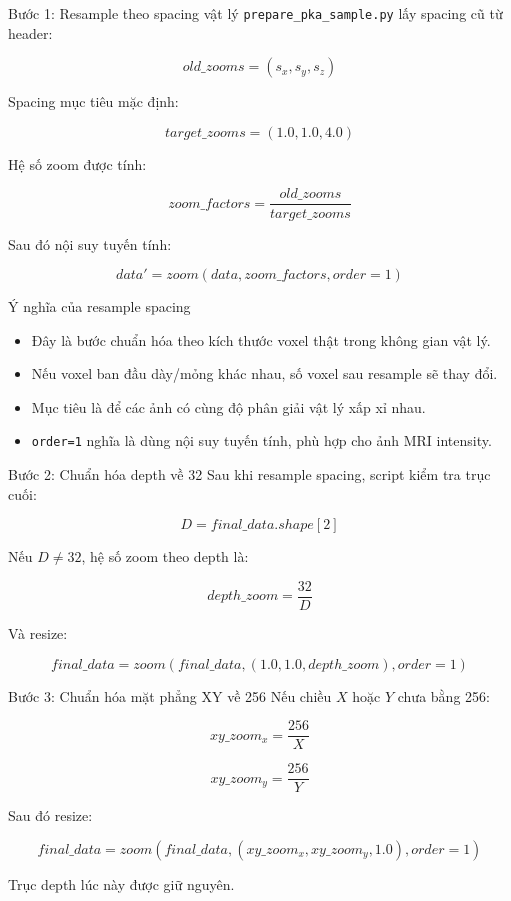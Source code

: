\documentclass[aspectratio=169]{beamer}
\begin{document}
\begin{frame}{Bước 1: Resample theo spacing vật lý}
  \texttt{prepare\_pka\_sample.py} lấy spacing cũ từ header:

  \[
    old\_zooms = (s_x, s_y, s_z)
  \]

  Spacing mục tiêu mặc định:

  \[
    target\_zooms = (1.0, 1.0, 4.0)
  \]

  Hệ số zoom được tính:

  \[
    zoom\_factors = \frac{old\_zooms}{target\_zooms}
  \]

  Sau đó nội suy tuyến tính:

  \[
    data' = zoom(data, zoom\_factors, order=1)
  \]
\end{frame}

\begin{frame}{Ý nghĩa của resample spacing}
  \begin{itemize}
    \item Đây là bước chuẩn hóa theo kích thước voxel thật trong không gian vật lý.
    \item Nếu voxel ban đầu dày/mỏng khác nhau, số voxel sau resample sẽ thay đổi.
    \item Mục tiêu là để các ảnh có cùng độ phân giải vật lý xấp xỉ nhau.
    \item \texttt{order=1} nghĩa là dùng nội suy tuyến tính, phù hợp cho ảnh MRI intensity.
  \end{itemize}
\end{frame}

\begin{frame}{Bước 2: Chuẩn hóa depth về 32}
  Sau khi resample spacing, script kiểm tra trục cuối:

  \[
    D = final\_data.shape[2]
  \]

  Nếu \(D \ne 32\), hệ số zoom theo depth là:

  \[
    depth\_zoom = \frac{32}{D}
  \]

  Và resize:

  \[
    final\_data = zoom(final\_data, (1.0, 1.0, depth\_zoom), order=1)
  \]
\end{frame}

\begin{frame}{Bước 3: Chuẩn hóa mặt phẳng XY về 256}
  Nếu chiều \(X\) hoặc \(Y\) chưa bằng 256:

  \[
    xy\_zoom_x = \frac{256}{X}
  \]

  \[
    xy\_zoom_y = \frac{256}{Y}
  \]

  Sau đó resize:

  \[
    final\_data = zoom(final\_data, (xy\_zoom_x, xy\_zoom_y, 1.0), order=1)
  \]

  Trục depth lúc này được giữ nguyên.
\end{frame}
\end{document}
